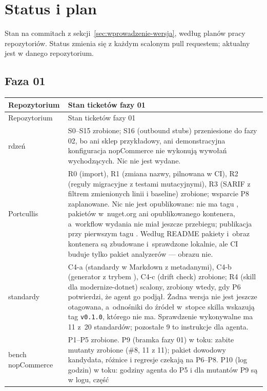 \section{Status i plan}\label{sec:status}

Stan na commitach z sekcji~\ref{sec:wprowadzenie-wersja}, według planów pracy
repozytoriów. Status zmienia się z każdym scalonym pull requestem; aktualny jest w
 danego repozytorium.

\subsection{Faza 01}\label{sec:status-faza01}

\begin{xltabular}{\linewidth}{@{}>{\raggedright\arraybackslash}p{3.6cm} >{\raggedright\arraybackslash}X@{}}
\toprule
Repozytorium & Stan ticketów fazy 01 \\
\midrule
\endfirsthead
\toprule
Repozytorium & Stan ticketów fazy 01 \\
\midrule
\endhead
rdzeń & S0--S15 zrobione; S16 (outbound stubs) przeniesione do fazy 02, bo ani sklep
przykładowy, ani demonstracyjna konfiguracja nopCommerce nie wykonują wywołań
wychodzących. Nic nie jest wydane. \\
Portcullis & R0 (import), R1 (zmiana nazwy, pilnowana w CI), R2 (reguły migracyjne z
testami mutacyjnymi), R3 (SARIF z filtrem zmienionych linii i baseline) zrobione;
wsparcie P8 zaplanowane. Nic nie jest opublikowane: nie ma tagu , pakietów
w~nuget.org ani opublikowanego kontenera, a~workflow wydania nie miał jeszcze przebiegu;
publikacja przy pierwszym tagu . Według README pakiety i~obraz kontenera są
zbudowane i~sprawdzone lokalnie, ale CI buduje tylko pakiet analyzerów --- obrazu nie. \\
standardy & C4-a (standardy w Markdown z metadanymi), C4-b (generator z trybem
), C4-c (drift check) zrobione; R4 (skill dla modernize-dotnet)
scalony, zrobiony wtedy, gdy P6 potwierdzi, że agent go podjął. Żadna wersja nie jest
jeszcze otagowana, a~odnośniki do źródeł w~stopce skilla wskazują tag \texttt{v0.1.0},
którego nie ma. Sprawdzenie wykonywalne ma 11 z~20 standardów; pozostałe 9 to instrukcje
dla agenta. \\
bench nopCommerce & P1--P5 zrobione. P9 (bramka fazy 01) w toku: zabite mutanty
zrobione (\#8, 11 z 11); pakiet dowodowy kandydata, różnice i regresje czekają na
P6--P8. P10 (log godzin) w toku: godziny agenta do P5 i dla mutantów P9 są w logu, część

\end{xltabular}
